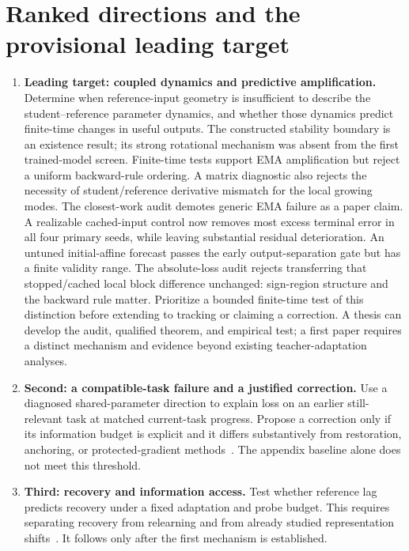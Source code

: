 \documentclass[11pt,a4paper]{article}
\begin{document}
\section{Ranked directions and the provisional leading target}
\begin{enumerate}[leftmargin=*]
\item \textbf{Leading target: coupled dynamics and predictive amplification.}
Determine when reference-input geometry is insufficient to describe the
student--reference parameter dynamics, and whether those dynamics predict
finite-time changes in useful outputs. The constructed stability boundary
is an existence result; its strong rotational mechanism was absent from
the first trained-model screen. Finite-time tests support EMA amplification
but reject a uniform backward-rule ordering. A matrix diagnostic also
rejects the necessity of student/reference derivative mismatch for the
local growing modes. The closest-work audit demotes generic EMA failure
as a paper claim. A realizable cached-input control now removes most
excess terminal error in all four primary seeds, while leaving substantial
residual deterioration. An untuned initial-affine forecast passes the
early output-separation gate but has a finite validity range. The
absolute-loss audit rejects transferring that stopped/cached local block
difference unchanged: sign-region structure and the backward rule matter.
Prioritize a bounded finite-time test of this distinction before
extending to tracking or claiming a correction. A thesis can develop the audit, qualified theorem, and empirical
test; a first paper requires a distinct mechanism and evidence beyond
existing teacher-adaptation analyses.
\item \textbf{Second: a compatible-task failure and a justified correction.}
Use a diagnosed shared-parameter direction to explain loss on an earlier
still-relevant task at matched current-task progress. Propose a correction
only if its information budget is explicit and it differs substantively
from restoration, anchoring, or protected-gradient methods~\cite{ogd}.
The appendix baseline alone does not meet this threshold.
\item \textbf{Third: recovery and information access.}
Test whether reference lag predicts recovery under a fixed adaptation and
probe budget. This requires separating recovery from relearning and from
already studied representation shifts~\cite{spurious}. It follows only
after the first mechanism is established.
\end{enumerate}
\end{document}
